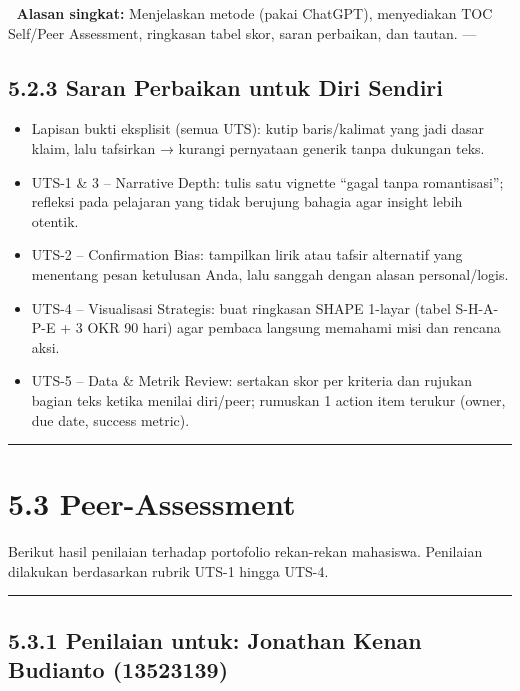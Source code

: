 \documentclass[
  letterpaper,
  DIV=11,
  numbers=noendperiod]{scrreprt}
\providecommand{\tightlist}{%
  \setlength{\itemsep}{0pt}\setlength{\parskip}{0pt}}
\begin{document}
📝 \textbf{Alasan singkat:} Menjelaskan metode (pakai ChatGPT),
menyediakan TOC Self/Peer Assessment, ringkasan tabel skor, saran
perbaikan, dan tautan. ---

\subsection{5.2.3 Saran Perbaikan untuk Diri
Sendiri}\label{saran-perbaikan-untuk-diri-sendiri}

\begin{itemize}
\tightlist
\item
  Lapisan bukti eksplisit (semua UTS): kutip baris/kalimat yang jadi
  dasar klaim, lalu tafsirkan → kurangi pernyataan generik tanpa
  dukungan teks.
\item
  UTS-1 \& 3 -- Narrative Depth: tulis satu vignette ``gagal tanpa
  romantisasi''; refleksi pada pelajaran yang tidak berujung bahagia
  agar insight lebih otentik.
\item
  UTS-2 -- Confirmation Bias: tampilkan lirik atau tafsir alternatif
  yang menentang pesan ketulusan Anda, lalu sanggah dengan alasan
  personal/logis.
\item
  UTS-4 -- Visualisasi Strategis: buat ringkasan SHAPE 1-layar (tabel
  S-H-A-P-E + 3 OKR 90 hari) agar pembaca langsung memahami misi dan
  rencana aksi.
\item
  UTS-5 -- Data \& Metrik Review: sertakan skor per kriteria dan rujukan
  bagian teks ketika menilai diri/peer; rumuskan 1 action item terukur
  (owner, due date, success metric).
\end{itemize}

\begin{center}\rule{0.5\linewidth}{0.5pt}\end{center}

\section{5.3 Peer-Assessment}\label{peer-assessment}

Berikut hasil penilaian terhadap portofolio rekan-rekan mahasiswa.
Penilaian dilakukan berdasarkan rubrik UTS-1 hingga UTS-4.

\begin{center}\rule{0.5\linewidth}{0.5pt}\end{center}

\subsection{5.3.1 Penilaian untuk: Jonathan Kenan Budianto
(13523139)}\label{penilaian-untuk-jonathan-kenan-budianto-13523139}
\end{document}
